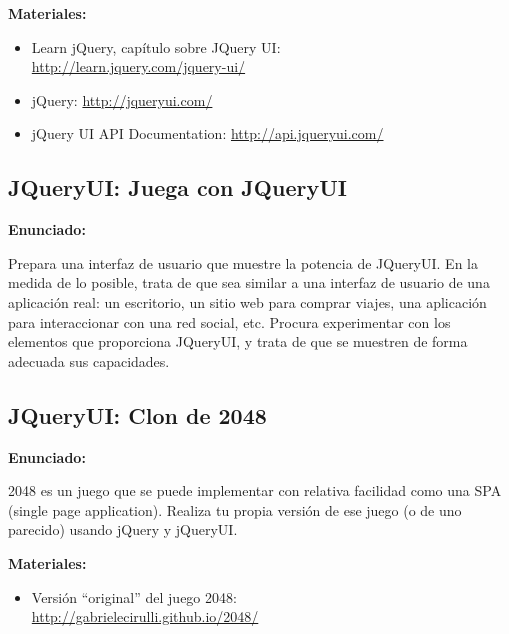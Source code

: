 \textbf{Materiales:}

\begin{itemize}
\item Learn jQuery, capítulo sobre JQuery UI: \\
  \url{http://learn.jquery.com/jquery-ui/}
\item jQuery: \url{http://jqueryui.com/}
\item jQuery UI API Documentation: \url{http://api.jqueryui.com/}
\end{itemize}

\subsection{JQueryUI: Juega con JQueryUI}
\label{subsec:otras-jqueryui-juega}

\textbf{Enunciado:}

Prepara una interfaz de usuario que muestre la potencia de JQueryUI. En la medida de lo posible, trata de que sea similar a una interfaz de usuario de una aplicación real: un escritorio, un sitio web para comprar viajes, una aplicación para interaccionar con una red social, etc. Procura experimentar con los elementos que proporciona JQueryUI, y trata de que se muestren de forma adecuada sus capacidades.

\subsection{JQueryUI: Clon de 2048}
\label{subsec:otras-jquery-2048}

\textbf{Enunciado:}

2048 es un juego que se puede implementar con relativa facilidad como una SPA (single page application). Realiza tu propia versión de ese juego (o de uno parecido) usando jQuery y jQueryUI.

\textbf{Materiales:}

\begin{itemize}
\item Versión ``original'' del juego 2048: \\
  \url{http://gabrielecirulli.github.io/2048/}
\end{itemize}

